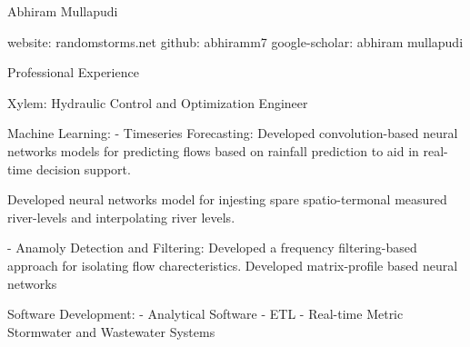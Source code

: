\documentclass{article}
\begin{document}
Abhiram Mullapudi

website: randomstorms.net
github: abhiramm7
google-scholar: abhiram mullapudi

Professional Experience

Xylem: Hydraulic Control and Optimization Engineer

Machine Learning:
- Timeseries Forecasting: 
	Developed convolution-based neural networks models for predicting flows based on rainfall prediction to aid in real-time decision support.

	Developed neural networks model for injesting spare spatio-termonal measured river-levels and interpolating river levels. 

- Anamoly Detection and Filtering: 
	Developed a frequency filtering-based approach for isolating flow charecteristics.	  Developed matrix-profile based neural networks 

Software Development:
- Analytical Software
- ETL
- Real-time Metric
Stormwater and Wastewater Systems
\end{document}
